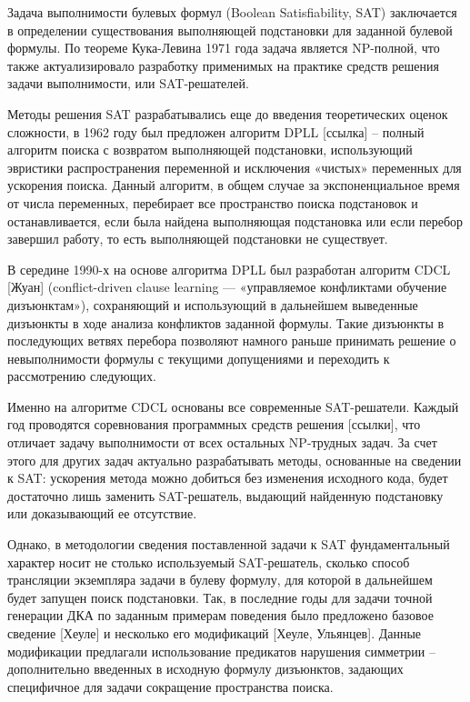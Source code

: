 Задача выполнимости булевых формул (Boolean Satisfiability, SAT) заключается в определении существования выполняющей подстановки для заданной булевой формулы. По теореме Кука-Левина 1971 года задача является NP-полной, что также актуализировало разработку применимых на практике средств решения задачи выполнимости, или SAT-решателей.

Методы решения SAT разрабатывались еще до введения теоретических оценок сложности, в 1962 году был предложен алгоритм DPLL [ссылка] – полный алгоритм поиска с возвратом выполняющей подстановки, использующий эвристики распространения переменной и исключения «чистых» переменных для ускорения поиска. Данный алгоритм, в общем случае за экспоненциальное время от числа переменных, перебирает все пространство поиска подстановок и останавливается, если была найдена выполняющая подстановка или если перебор завершил работу, то есть выполняющей подстановки не существует. 

В середине 1990-х на основе алгоритма DPLL был разработан алгоритм CDCL [Жуан] (conflict-driven clause learning — «управляемое конфликтами обучение дизъюнктам»), сохраняющий  и использующий в дальнейшем выведенные дизъюнкты в ходе анализа конфликтов заданной формулы. Такие дизъюнкты в последующих ветвях перебора позволяют намного раньше принимать решение о невыполнимости формулы с текущими допущениями и переходить к рассмотрению следующих.

Именно на алгоритме CDCL основаны все современные SAT-решатели. Каждый год проводятся соревнования программных средств решения [ссылки], что отличает задачу выполнимости от всех остальных NP-трудных задач. За счет этого для других задач актуально разрабатывать методы, основанные на сведении к SAT: ускорения метода можно добиться без изменения исходного кода, будет достаточно лишь заменить SAT-решатель, выдающий найденную подстановку или доказывающий ее отсутствие.

Однако, в методологии сведения поставленной задачи к SAT фундаментальный характер носит не столько используемый SAT-решатель, сколько способ трансляции экземпляра задачи в булеву формулу, для которой в дальнейшем будет запущен поиск подстановки. Так, в последние годы для задачи точной генерации ДКА по заданным примерам поведения было предложено базовое сведение [Хеуле] и несколько его модификаций [Хеуле, Ульянцев]. Данные модификации предлагали использование предикатов нарушения симметрии – дополнительно введенных в исходную формулу дизъюнктов, задающих специфичное для задачи сокращение пространства поиска.

